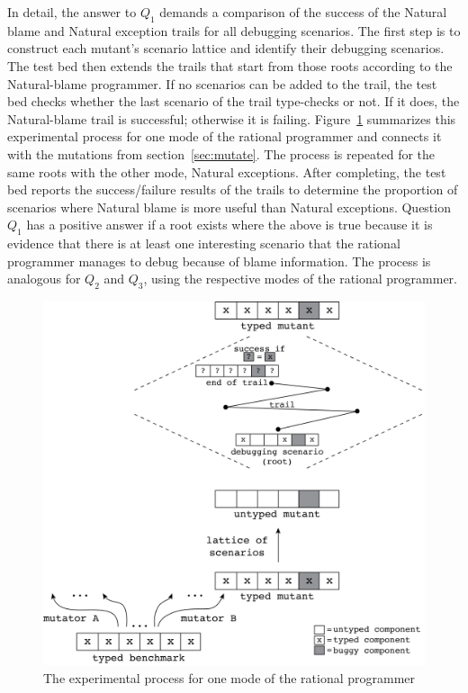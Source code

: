 
In detail, the answer to $Q_1$ demands a comparison of the success of the Natural
blame and Natural exception trails for all debugging scenarios.  The
first step is to construct each mutant's scenario lattice and identify their
debugging scenarios.  The test bed then extends the trails that start
from those roots according to the Natural-blame programmer.  If no scenarios can
be added to the trail, the test bed checks whether the last scenario
of the trail type-checks or not. If it does, the
Natural-blame trail is successful; otherwise it is failing. 
Figure~\ref{fig:process} summarizes this experimental process for
one mode of the rational programmer and connects it with the mutations from
section~\ref{sec:mutate}.
The process is repeated for the same roots with the other mode, Natural
exceptions.
After completing, the test bed
reports the success/failure results of the trails to determine the proportion of
scenarios where Natural blame is more useful than Natural exceptions.  Question
$Q_1$ has a positive answer if a root exists where the above is true because it
is evidence that there is at least one interesting scenario that the rational
programmer manages to debug because of blame information.  The process is analogous
for $Q_2$ and $Q_3$, using the respective modes of the rational programmer.

\begin{figure}[bh]
  \centering
  \includegraphics[scale=0.36]{./Images/process}
  \caption{The experimental process for one mode of the rational programmer}
  \label{fig:process}
\end{figure}


